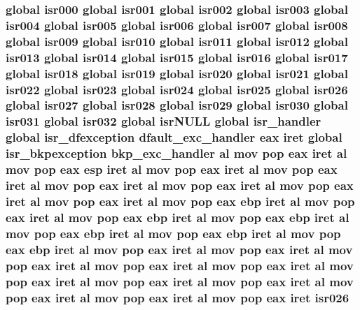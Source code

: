 \subsubsection[{\texorpdfstring{isr026}{isr026}}]{\setlength{\rightskip}{0pt plus 5cm}global {\bf isr000} global {\bf isr001} global {\bf isr002} global {\bf isr003} global {\bf isr004} global {\bf isr005} global {\bf isr006} global {\bf isr007} global {\bf isr008} global {\bf isr009} global {\bf isr010} global {\bf isr011} global {\bf isr012} global {\bf isr013} global {\bf isr014} global {\bf isr015} global {\bf isr016} global {\bf isr017} global {\bf isr018} global {\bf isr019} global {\bf isr020} global {\bf isr021} global {\bf isr022} global {\bf isr023} global {\bf isr024} global {\bf isr025} global isr026 global {\bf isr027} global {\bf isr028} global {\bf isr029} global {\bf isr030} global {\bf isr031} global isr032 global isr\+N\+U\+LL global isr\+\_\+handler global {\bf isr\+\_\+dfexception} {\bf dfault\+\_\+exc\+\_\+handler} eax iret global {\bf isr\+\_\+bkpexception} {\bf bkp\+\_\+exc\+\_\+handler} {\bf al} {\bf mov} pop eax iret {\bf al} {\bf mov} pop eax esp iret {\bf al} {\bf mov} pop eax iret {\bf al} {\bf mov} pop eax iret {\bf al} {\bf mov} pop eax iret {\bf al} {\bf mov} pop eax iret {\bf al} {\bf mov} pop eax iret {\bf al} {\bf mov} pop eax iret {\bf al} {\bf mov} pop eax ebp iret {\bf al} {\bf mov} pop eax iret {\bf al} {\bf mov} pop eax ebp iret {\bf al} {\bf mov} pop eax ebp iret {\bf al} {\bf mov} pop eax ebp iret {\bf al} {\bf mov} pop eax ebp iret {\bf al} {\bf mov} pop eax ebp iret {\bf al} {\bf mov} pop eax iret {\bf al} {\bf mov} pop eax iret {\bf al} {\bf mov} pop eax iret {\bf al} {\bf mov} pop eax iret {\bf al} {\bf mov} pop eax iret {\bf al} {\bf mov} pop eax iret {\bf al} {\bf mov} pop eax iret {\bf al} {\bf mov} pop eax iret {\bf al} {\bf mov} pop eax iret {\bf al} {\bf mov} pop eax iret {\bf al} {\bf mov} pop eax iret isr026}\hypertarget{isrs_8as_a72b5c145fd51ef82976ed24159d342dc}{}\label{isrs_8as_a72b5c145fd51ef82976ed24159d342dc}
